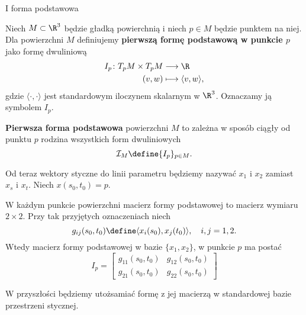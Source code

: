\begin{frame}[<+->]{I forma podstawowa}

\begin{definicja}
Niech $M\subset \R^3$ będzie gładką powierchnią i niech $p\in M$ będzie punktem na niej. Dla powierzchni $M$ definiujemy \textbf{pierwszą formę podstawową w punkcie $p$} jako formę dwuliniową
\begin{align*}
I_p\colon T_pM\times T_pM &\longrightarrow \R\\
(v,w)&\longmapsto\langle v,w\rangle,
\end{align*}
gdzie $\langle\cdot,\cdot\rangle$ jest standardowym iloczynem skalarnym w $\R^3$. Oznaczamy ją symbolem $I_p.$
\end{definicja}

\end{frame}
\begin{frame}

\begin{definicja}
\textbf{Pierwsza forma podstawowa} powierzchni $M$ to zależna w sposób ciągły od punktu $p$ rodzina wszystkich form dwuliniowych \[\mathcal{I}_M\define\{I_p\}_{p\in M}.\]
\end{definicja}

\pause Od teraz wektory styczne do linii parametru będziemy nazywać $x_1$ i $x_2$ zamiast $x_s$ i $x_t$. Niech $x(s_0,t_0)=p$.

\end{frame}
\begin{frame}
\begin{uwaga}
W każdym punkcie powierzchni macierz formy podstawowej to macierz wymiaru $2\times 2$. 
\pause Przy tak przyjętych oznaczeniach niech
\[g_{ij}(s_0,t_0)\define\langle x_i(s_0),x_j(t_0)\rangle,\quad i,j = 1,2.\]
Wtedy macierz formy podstawowej w bazie $\{x_1,x_2\}$, w punkcie $p$ ma postać
\[I_p=\left[
\begin{array}{cc}
g_{11}(s_0,t_0) & g_{12}(s_0,t_0)\\
g_{21}(s_0,t_0) & g_{22}(s_0,t_0)
\end{array}
\right]
\]
\end{uwaga}

\pause W przyszłości będziemy utożsamiać formę z jej macierzą w standardowej bazie przestrzeni stycznej.


\end{frame}
